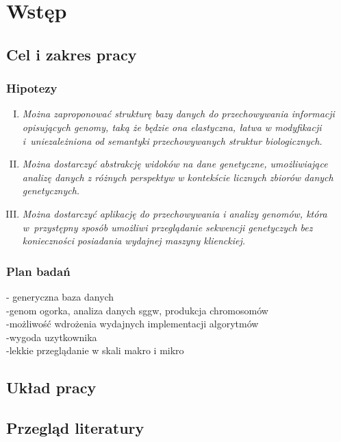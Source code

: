 
\chapter{Wstęp}
\label{section:wstep}

\section{Cel i zakres pracy}
\label{section:cel_i_zakres_pracy}

\subsection{Hipotezy}

\begin{enumerate}[I.]
	\item \textit{
		Można zaproponować strukturę bazy danych do przechowywania informacji opisujących genomy, taką że będzie ona elastyczna, łatwa w modyfikacji i~uniezależniona od semantyki przechowywanych struktur biologicznych.
		} \\
	
	\item \textit{
		Można dostarczyć abstrakcję widoków na dane genetyczne, umożliwiające analizę danych z różnych perspektyw w kontekście licznych zbiorów
		danych genetycznych.
		} \\
	
	\item \textit{
		Można dostarczyć aplikację do przechowywania i analizy genomów, która w~przystępny sposób umożliwi przeglądanie sekwencji genetyczych bez konieczności posiadania wydajnej maszyny klienckiej. 
		} \\
	
\end{enumerate}

\subsection{Plan badań}
- generyczna baza danych \\
-genom ogorka, analiza danych sggw, produkcja chromosomów \\
-możliwość wdrożenia wydajnych implementacji algorytmów \\
-wygoda uzytkownika \\
-lekkie przeglądanie w skali makro i mikro \\

\section{Układ pracy}
\label{section:uklad_pracy}

\section{Przegląd literatury}
\label{section:przeglad_literatury}
